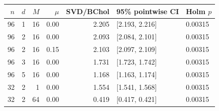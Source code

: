 \begin{tabular}{rrrrrll}
\toprule
$n$ & $d$ & $M$ & $\mu$ & SVD/BChol & 95\% pointwise CI & Holm $p$ \\
\midrule
96 & 1 & 16 & 0.00 & 2.205 & [2.193, 2.216] & 0.00315 \\
96 & 2 & 16 & 0.00 & 2.093 & [2.084, 2.101] & 0.00315 \\
96 & 2 & 16 & 0.15 & 2.103 & [2.097, 2.109] & 0.00315 \\
96 & 3 & 16 & 0.00 & 1.731 & [1.723, 1.742] & 0.00315 \\
96 & 5 & 16 & 0.00 & 1.168 & [1.163, 1.174] & 0.00315 \\
32 & 2 & 1 & 0.00 & 1.554 & [1.541, 1.568] & 0.00315 \\
32 & 2 & 64 & 0.00 & 0.419 & [0.417, 0.421] & 0.00315 \\
\bottomrule
\end{tabular}
